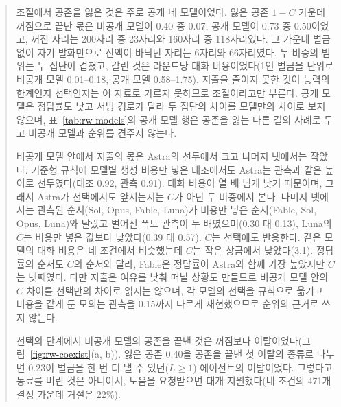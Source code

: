 \begin{quote}
{\color{black}조절에서 공존을 잃은 것은 주로 공개 네 모델이었다. 잃은 공존 $1-C$ 가운데 꺼짐으로 끝난 몫은 비공개 모델이 0.40 중 0.07, 공개 모델이 0.73 중 0.50이었고, 꺼진 자리는 200자리 중 23자리와 160자리 중 118자리였다. 그 가운데 벌금 없이 자기 발화만으로 잔액이 바닥난 자리는 6자리와 66자리였다. 두 비중의 범위는 두 집단이 겹쳤고, 갈린 것은 라운드당 대화 비용이었다(1인 벌금을 단위로 비공개 모델 0.01--0.18, 공개 모델 0.58--1.75). 지출을 줄이지 못한 것이 능력의 한계인지 선택인지는 이 자료로 가르지 못하므로 조절이라고만 부른다. 공개 모델은 정답률도 낮고 서빙 경로가 달라 두 집단의 차이를 모델만의 차이로 보지 않으며, 표~\ref{tab:rw-models}의 공개 모델 행은 공존을 잃는 다른 길의 사례로 두고 비공개 모델과 순위를 견주지 않는다.}

{\color{black}비공개 모델 안에서 지출의 몫은 Astra의 선두에서 크고 나머지 넷에서는 작았다. 기준형 규칙에 모델별 생성 비용만 넣은 대조에서도 Astra는 관측과 같은 높이로 선두였다(대조 0.92, 관측 0.91). 대화 비용이 열 배 넘게 낮기 때문이며, 그래서 Astra가 선택에서도 앞서는지는 $C$가 아닌 두 비중에서 본다. 나머지 넷에서는 관측된 순서(Sol, Opus, Fable, Luna)가 비용만 넣은 순서(Fable, Sol, Opus, Luna)와 달랐고 벌어진 폭도 관측이 두 배였으며(0.30 대 0.13), Luna의 $C$는 비용만 넣은 값보다 낮았다(0.39 대 0.57). $C$는 선택에도 반응한다. 같은 모델의 대화 비용은 네 조건에서 비슷했는데 $C$는 작은 상금에서 낮았다(3.1). 정답률의 순서도 $C$의 순서와 달라, Fable은 정답률이 Astra와 함께 가장 높았지만 $C$는 넷째였다. 다만 지출은 여유를 낮춰 떠날 상황도 만들므로 비공개 모델 안의 $C$ 차이를 선택만의 차이로 읽지는 않으며, 각 모델의 선택을 규칙으로 옮기고 비용을 같게 둔 모의는 관측을 0.15까지 다르게 재현했으므로 순위의 근거로 쓰지 않는다.}

{\color{black}선택의 단계에서 비공개 모델의 공존을 끝낸 것은 꺼짐보다 이탈이었다(그림~\ref{fig:rw-coexist}(a, b)). 잃은 공존 0.40을 공존을 끝낸 첫 이탈의 종류로 나누면 0.23이 벌금을 한 번 더 낼 수 있던($L\geq1$) 에이전트의 이탈이었다. 그렇다고 동료를 버린 것은 아니어서, 도움을 요청받으면 대개 지원했다(네 조건의 471개 결정 가운데 거절은 22\%).}


\end{quote}
